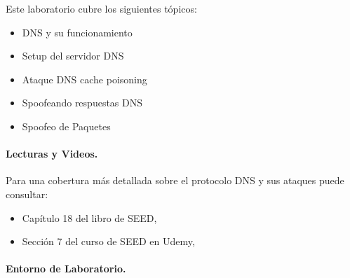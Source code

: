 Este laboratorio cubre los siguientes tópicos:


\begin{itemize}[noitemsep]
\item DNS y su funcionamiento
\item Setup del servidor DNS
\item Ataque DNS cache poisoning
\item Spoofeando respuestas DNS
\item Spoofeo de Paquetes
\end{itemize}


\paragraph{Lecturas y Videos.}
Para una cobertura más detallada sobre el protocolo DNS y sus ataques puede consultar:

\begin{itemize}
\item Capítulo 18 del libro de SEED, \seedbook
\item Sección 7 del curso de SEED en Udemy, \seedisvideo
\end{itemize}


\paragraph{Entorno de Laboratorio.} \seedenvironmentC


\begin{comment}
\vspace{0.2in}
\noindent
\fbox{\parbox{\textwidth}{
\noindent
\textbf{Personalización.}
En la descripción de este laboratio usamos el dominio \texttt{attacker32.com} para referirnos al dominio que es controlado por el atacante. Cuando los estudiantes hagan este laboratorio, no se les permitirá usar este nombre; en lugar de esto deben de usar un nombre de dominio que incluya su apellido.
El objetivo de esto es diferenciar el trabajo de cada uno de los estudiantes. Dado que el nombre del dominio es visible solamente dentro del entorno del laboratorio y no por fuera de este, es posible usar este tipo de nombre de forma segura.
}}
\end{comment}




